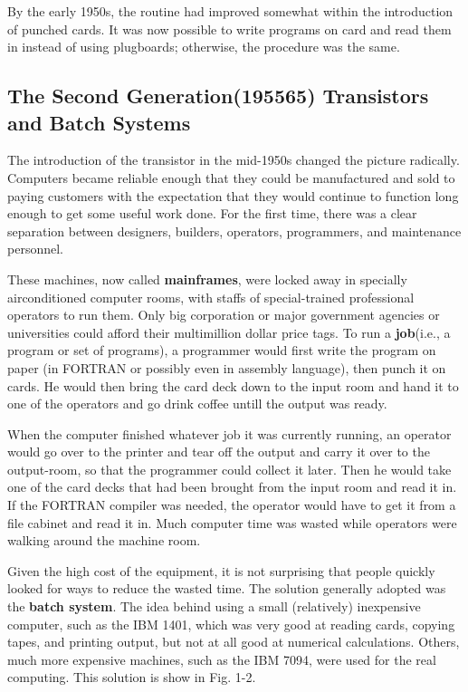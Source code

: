 \documentclass{book}
\newcommand {\kw}  [1] {\textbf{#1}}
\begin{document}
By the early 1950s, the routine had improved somewhat within the introduction of punched cards.
It was now possible to write programs on card and read them in instead of using plugboards; otherwise, the procedure was the same.

\subsection{The Second Generation(195565) Transistors and Batch Systems}
The introduction of the transistor in the mid-1950s changed the picture radically.
Computers became reliable enough that they could be manufactured and sold to paying customers with the expectation 
that they would continue to function long enough to get some useful work done.
For the first time, there was a clear separation between designers, builders, operators, programmers, and maintenance personnel.

These machines, now called \kw{mainframes}, were locked away in specially airconditioned computer rooms, 
with staffs of special-trained professional operators to run them.
Only big corporation or major government agencies or universities could afford their multimillion dollar price tags.
To run a \kw{job}(i.e., a program or set of programs), a programmer would first write the program on paper 
(in FORTRAN or possibly even in assembly language), then punch it on cards.
He would then bring the card deck down to the input room and hand it to one of the operators and go drink coffee untill the output was ready.

When the computer finished whatever job it was currently running, an operator would go over to the printer and tear off the output
and carry it over to the output-room, so that the programmer could collect it later. 
Then he would take one of the card decks that had been brought from the input room and read it in.
If the FORTRAN compiler was needed, the operator would have to get it from a file cabinet and read it in.
Much computer time was wasted while operators were walking around the machine room.

Given the high cost of the equipment, it is not surprising that people quickly looked for ways to reduce the wasted time.
The solution generally adopted was the \kw{batch system}.
The idea behind using a small (relatively) inexpensive computer, such as the IBM 1401, 
which was very good at reading cards, copying tapes, and printing output, but not at all good at numerical calculations.
Others, much more expensive machines, such as the IBM 7094, were used for the real computing.
This solution is show in Fig. 1-2.
\end{document}
